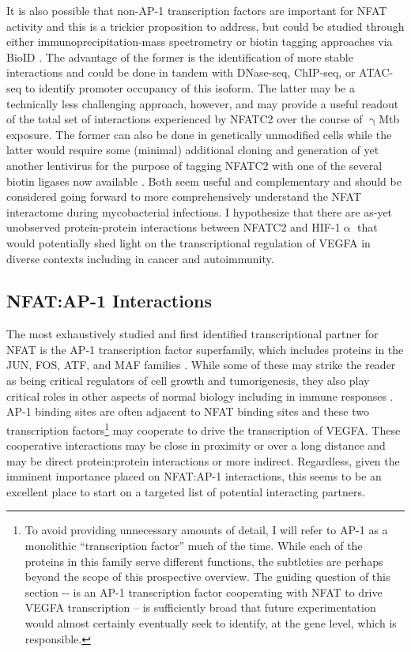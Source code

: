 It is also possible that non\hyp{}AP\hyp{}1 transcription factors are important for NFAT activity and this is a trickier proposition to address, but could be studied through either immunoprecipitation\hyp{}mass spectrometry or biotin tagging approaches via BioID \citep{Roux2012}. The advantage of the former is the identification of more stable interactions and could be done in tandem with DNase\hyp{}seq, ChIP\hyp{}seq, or ATAC\hyp{}seq to identify promoter occupancy of this isoform. The latter may be a technically less challenging approach, however, and may provide a useful readout of the total set of interactions experienced by NFATC2 over the course of $\upgamma$Mtb exposure. The former can also be done in genetically unmodified cells while the latter would require some (minimal) additional cloning and generation of yet another lentivirus for the purpose of tagging NFATC2 with one of the several biotin ligases now available \citep{Cho2020}. Both seem useful and complementary and should be considered going forward to more comprehensively understand the NFAT interactome during mycobacterial infections. I hypothesize that there are as\hyp{}yet unobserved protein\hyp{}protein interactions between NFATC2 and HIF\hyp{}1$\upalpha$ that would potentially shed light on the transcriptional regulation of VEGFA in diverse contexts including in cancer and autoimmunity. 

\subsection{NFAT:AP\hyp{}1 Interactions}\label{nfatap1}

The most exhaustively studied and first identified transcriptional partner for NFAT is the AP\hyp{}1 transcription factor superfamily, which includes proteins in the JUN, FOS, ATF, and MAF families \citep{Boise1993}. While some of these may strike the reader as being critical regulators of cell growth and tumorigenesis, they also play critical roles in other aspects of normal biology including in immune responses \citep{Macian2001, Eferl2003}. AP\hyp{}1 binding sites are often adjacent to NFAT binding sites and these two transcription factors\footnote{To avoid providing unnecessary amounts of detail, I will refer to AP\hyp{}1 as a monolithic ``transcription factor'' much of the time. While each of the proteins in this family serve different functions, the subtleties are perhaps beyond the scope of this prospective overview. The guiding question of this section \hyp{}\hyp{} is an AP\hyp{}1 transcription factor cooperating with NFAT to drive VEGFA transcription -- is sufficiently broad that future experimentation would almost certainly eventually seek to identify, at the gene level, which is responsible.} may cooperate to drive the transcription of VEGFA. These cooperative interactions may be close in proximity or over a long distance and may be direct protein:protein interactions or more indirect. Regardless, given the imminent importance placed on NFAT:AP\hyp{}1 interactions, this seems to be an excellent place to start on a targeted list of potential interacting partners.

